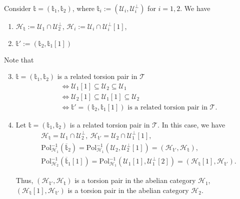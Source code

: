 \begin{rmk}
  Consider $\mathbb{t}=(\mathbb{t}_1,\mathbb{t}_2)$, where $\mathbb{t}_i:=(\mathcal{U}_i,\mathcal{U}_i^\perp)$ for
  $i=1,2$. We have
  \begin{enumerate}
    \item $\mathcal{H}_\mathbb{t}:=\mathcal{U}_1\cap\mathcal{U}_2^\perp$,
      $\mathcal{H}_i:=\mathcal{U}_i\cap\mathcal{U}_i^\perp[1]$,
    \item $\mathbb{t}' :=(\mathbb{t}_2,\mathbb{t}_1[1])$
  \end{enumerate}

  Note that
  \begin{enumerate}
    \setcounter{enumi}{2}
    \item $\mathbb{t}=(\mathbb{t}_1,\mathbb{t}_2)$ is a related torsion pair in $\mathcal{T}$
      \begin{align*}
        &\Leftrightarrow \mathcal{U}_1[1]\subseteq\mathcal{U}_2\subseteq\mathcal{U}_1\\
        &\Leftrightarrow \mathcal{U}_2[1]\subseteq\mathcal{U}_1[1]\subseteq\mathcal{U}_2\\
        &\Leftrightarrow \mathbb{t}'=(\mathbb{t}_2,\mathbb{t}_1[1]) \text{ is a related torsion pair in }\mathcal{T}.
      \end{align*}
    \item Let $\mathbb{t}=(\mathbb{t}_1,\mathbb{t}_2)$ is a related torsion pair in $\mathcal{T}$. In
      this case, we have
      \begin{align*}
        &\mathcal{H}_\mathbb{t} = \mathcal{U}_1\cap\mathcal{U}_2^\perp,~
        \mathcal{H}_{\mathbb{t}'}=\mathcal{U}_2\cap \mathcal{U}_1^\perp[1],\\
        & \mathrm{Pol}_{\mathcal{H}_1}^{-1}(\overline{\mathbb{t}}_2)=
        \mathrm{Pol}_{\mathcal{H}_1}^{-1}(\mathcal{U}_2,\mathcal{U}_2^\perp[1])=
        (\mathcal{H}_{\mathbb{t}'},\mathcal{H}_{\mathbb{t}}),\\
        &\mathrm{Pol}_{\mathcal{H}_2}^{-1}(\overline{\mathbb{t}}_1[1])=
        \mathrm{Pol}_{\mathcal{H}_1}^{-1}(\mathcal{U}_1[1],\mathcal{U}_1^\perp[2])=
        (\mathcal{H}_{\mathbb{t}}[1],\mathcal{H}_{\mathbb{t}'}).
      \end{align*}

      Thus, $(\mathcal{H}_{\mathbb{t}'},\mathcal{H}_\mathbb{t})$ is a torsion pair in the abelian
      category $\mathcal{H}_1$,
      $(\mathcal{H}_\mathbb{t}[1],\mathcal{H}_{\mathbb{t}'})$ is a torsion pair in the abelian category
      $\mathcal{H}_2$.
  \end{enumerate}
\end{rmk}

